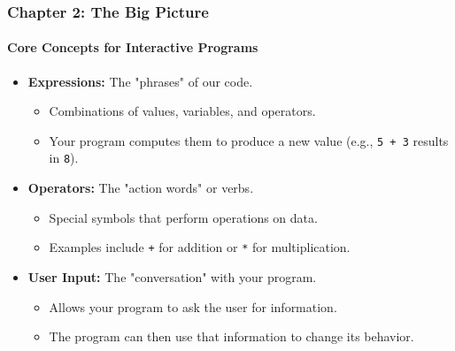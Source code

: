 \documentclass{beamer}
\begin{document}
\begin{frame}[fragile]
    \frametitle{Chapter 2: The Big Picture}
    \framesubtitle{Core Concepts for Interactive Programs}

    \begin{itemize}
        \item \textbf{Expressions:} The "phrases" of our code.
        \begin{itemize}
            \item Combinations of values, variables, and operators.
            \item Your program computes them to produce a new value (e.g., \texttt{5 + 3} results in \texttt{8}).
        \end{itemize}
        
        \vspace{1em}
        
        \item \textbf{Operators:} The "action words" or verbs.
        \begin{itemize}
            \item Special symbols that perform operations on data.
            \item Examples include \texttt{+} for addition or \texttt{*} for multiplication.
        \end{itemize}
        
        \vspace{1em}
        
        \item \textbf{User Input:} The "conversation" with your program.
        \begin{itemize}
            \item Allows your program to ask the user for information.
            \item The program can then use that information to change its behavior.
        \end{itemize}
    \end{itemize}
    
\end{frame}
\end{document}

